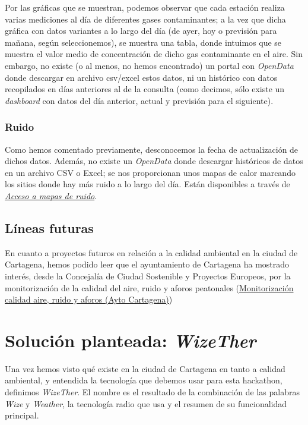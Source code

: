 \documentclass[12pt]{article}
\begin{document}
	\noindent Por las gráficas que se muestran, podemos observar que cada estación realiza varias mediciones al día de diferentes gases contaminantes; a la vez que dicha gráfica con datos variantes a lo largo del día (de ayer, hoy o previsión para mañana, según seleccionemos), se muestra una tabla, donde intuimos que se muestra el valor medio de concentración de dicho gas contaminante en el aire. Sin embargo, no existe (o al menos, no hemos encontrado) un portal con \textit{OpenData} donde descargar en archivo csv/excel estos datos, ni un histórico con datos recopilados en días anteriores al de la consulta (como decimos, sólo existe un \textit{dashboard} con datos del día anterior, actual y previsión para el siguiente). \\
	
	\subsubsection{Ruido}
	
	Como hemos comentado previamente, desconocemos la fecha de actualización de dichos datos. Además, no existe un \textit{OpenData} donde descargar históricos de datos en un archivo CSV o Excel; se nos proporcionan unos mapas de calor marcando los sitios donde hay más ruido a lo largo del día. Están disponibles a través de \href{https://www.cartagena.es/plantillas/14b.asp?pt_idpag=1431}{\textit{Acceso a mapas de ruido}}.

	\subsection{Líneas futuras}
		
		En cuanto a proyectos futuros en relación a la calidad ambiental en la ciudad de Cartagena, hemos podido leer que el ayuntamiento de Cartagena ha mostrado interés, desde la Concejalía de Ciudad Sostenible y Proyectos Europeos, por la monitorización de la calidad del aire, ruido y aforos peatonales (\href{https://murciaplaza.com/cartagena-estudia-la-calidad-del-aire-ruidos-y-aforos-para-reducir-el-impacto-climatico-y-la-movilidad-urbana}{Monitorización calidad aire, ruido y aforos (Ayto Cartagena)})

\pagebreak

\section{Solución planteada: \textit{WizeTher}}

Una vez hemos visto qué existe en la ciudad de Cartagena en tanto a calidad ambiental, y entendida la tecnología que debemos usar para esta hackathon, definimos \textit{WizeTher}. El nombre es el resultado de la combinación de las palabras \textit{Wize} y \textit{Weather}, la tecnología radio que usa y el resumen de su funcionalidad principal. 
\end{document}
